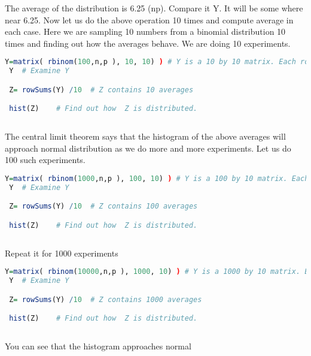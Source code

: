 \documentclass["../Applied_probabillity _and_statistics_lab_KTU.tex"]{subfiles}
\begin{document}
The average of the distribution is 6.25 (np). Compare it Y. It will be some where near 6.25.
Now let us do the above operation 10 times and compute average in each  case. Here we are sampling 10 numbers from a binomial distribution 10 times and finding out how the averages behave.  We are doing 10 experiments.


 \begin{lstlisting}[language=R]
 Y=matrix( rbinom(100,n,p ), 10, 10) ) # Y is a 10 by 10 matrix. Each row contains 10 numbers sampled from the binomial distribution.
 Y  # Examine Y

 Z= rowSums(Y) /10  # Z contains 10 averages  

 hist(Z)    # Find out how  Z is distributed.
 
\end{lstlisting}

The  central limit theorem says that the histogram  of the above averages will approach normal distribution as we do more and more experiments.
 Let us do 100 such experiments.
 
 
 \begin{lstlisting}[language=R]
 Y=matrix( rbinom(1000,n,p ), 100, 10) ) # Y is a 100 by 10 matrix. Each row contains 10 numbers sampled from the binomial distribution.
 Y  # Examine Y

 Z= rowSums(Y) /10  # Z contains 100 averages  

 hist(Z)    # Find out how  Z is distributed.
 
\end{lstlisting}
 
 Repeat it for  1000 experiments 
 
 
 \begin{lstlisting}[language=R]
 Y=matrix( rbinom(10000,n,p ), 1000, 10) ) # Y is a 1000 by 10 matrix. Each row contains 10 numbers sampled from the binomial distribution.
 Y  # Examine Y

 Z= rowSums(Y) /10  # Z contains 1000 averages  

 hist(Z)    # Find out how  Z is distributed.
 
\end{lstlisting}

You can see that the histogram approaches normal
\end{document}
